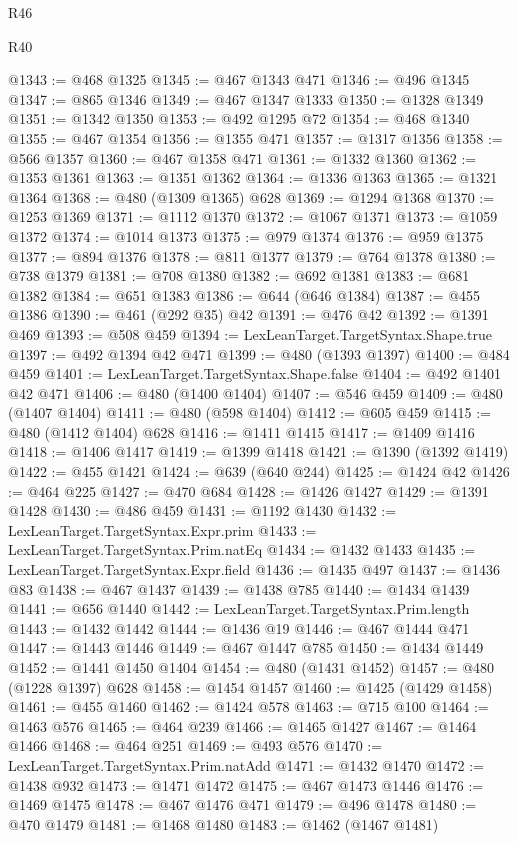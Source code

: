 \begin{lexlean}{R46}
\begin{lexlean}{R40}
\begin{coremodule}
{{{{{{{{{{{{{{{{{{{{{{{{{{{{{{{{{{{{{{{{{{{{{{{{{{{{{{{{{{{{{{{{{{{{{{{{{{{{{{{{{{{{{{{{{{{{{{{{{{{{{{{{{{{{{@1343 := @468 @1325
@1345 := @467 @1343 @471
@1346 := @496 @1345
@1347 := @865 @1346
@1349 := @467 @1347 @1333
@1350 := @1328 @1349
@1351 := @1342 @1350
@1353 := @492 @1295 @72
@1354 := @468 @1340
@1355 := @467 @1354
@1356 := @1355 @471
@1357 := @1317 @1356
@1358 := @566 @1357
@1360 := @467 @1358 @471
@1361 := @1332 @1360
@1362 := @1353 @1361
@1363 := @1351 @1362
@1364 := @1336 @1363
@1365 := @1321 @1364
@1368 := @480 (@1309 @1365) @628
@1369 := @1294 @1368
@1370 := @1253 @1369
@1371 := @1112 @1370
@1372 := @1067 @1371
@1373 := @1059 @1372
@1374 := @1014 @1373
@1375 := @979 @1374
@1376 := @959 @1375
@1377 := @894 @1376
@1378 := @811 @1377
@1379 := @764 @1378
@1380 := @738 @1379
@1381 := @708 @1380
@1382 := @692 @1381
@1383 := @681 @1382
@1384 := @651 @1383
@1386 := @644 (@646 @1384)
@1387 := @455 @1386
@1390 := @461 (@292 @35) @42
@1391 := @476 @42
@1392 := @1391 @469
@1393 := @508 @459
@1394 := LexLeanTarget.TargetSyntax.Shape.true
@1397 := @492 @1394 @42 @471
@1399 := @480 (@1393 @1397)
@1400 := @484 @459
@1401 := LexLeanTarget.TargetSyntax.Shape.false
@1404 := @492 @1401 @42 @471
@1406 := @480 (@1400 @1404)
@1407 := @546 @459
@1409 := @480 (@1407 @1404)
@1411 := @480 (@598 @1404)
@1412 := @605 @459
@1415 := @480 (@1412 @1404) @628
@1416 := @1411 @1415
@1417 := @1409 @1416
@1418 := @1406 @1417
@1419 := @1399 @1418
@1421 := @1390 (@1392 @1419)
@1422 := @455 @1421
@1424 := @639 (@640 @244)
@1425 := @1424 @42
@1426 := @464 @225
@1427 := @470 @684
@1428 := @1426 @1427
@1429 := @1391 @1428
@1430 := @486 @459
@1431 := @1192 @1430
@1432 := LexLeanTarget.TargetSyntax.Expr.prim
@1433 := LexLeanTarget.TargetSyntax.Prim.natEq
@1434 := @1432 @1433
@1435 := LexLeanTarget.TargetSyntax.Expr.field
@1436 := @1435 @497
@1437 := @1436 @83
@1438 := @467 @1437
@1439 := @1438 @785
@1440 := @1434 @1439
@1441 := @656 @1440
@1442 := LexLeanTarget.TargetSyntax.Prim.length
@1443 := @1432 @1442
@1444 := @1436 @19
@1446 := @467 @1444 @471
@1447 := @1443 @1446
@1449 := @467 @1447 @785
@1450 := @1434 @1449
@1452 := @1441 @1450 @1404
@1454 := @480 (@1431 @1452)
@1457 := @480 (@1228 @1397) @628
@1458 := @1454 @1457
@1460 := @1425 (@1429 @1458)
@1461 := @455 @1460
@1462 := @1424 @578
@1463 := @715 @100
@1464 := @1463 @576
@1465 := @464 @239
@1466 := @1465 @1427
@1467 := @1464 @1466
@1468 := @464 @251
@1469 := @493 @576
@1470 := LexLeanTarget.TargetSyntax.Prim.natAdd
@1471 := @1432 @1470
@1472 := @1438 @932
@1473 := @1471 @1472
@1475 := @467 @1473 @1446
@1476 := @1469 @1475
@1478 := @467 @1476 @471
@1479 := @496 @1478
@1480 := @470 @1479
@1481 := @1468 @1480
@1483 := @1462 (@1467 @1481)
}}}}}}}}}}}}}}}}}}}}}}}}}}}}}}}}}}}}}}}}}}}}}}}}}}}}}}}}}}}}}}}}}}}}}}}}}}}}}}}}}}}}}}}}}}}}}}}}}}}}}}}}}}}}}
\end{coremodule}
\end{lexlean}
\end{lexlean}
